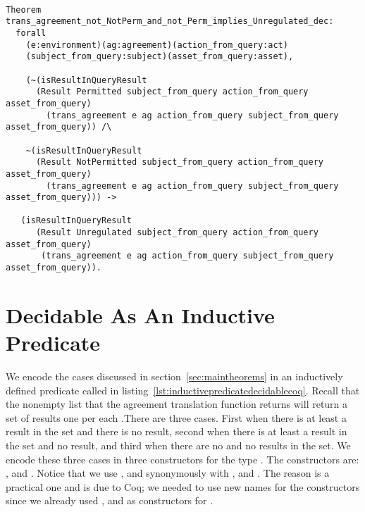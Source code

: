 \begin{lstlisting}

Theorem trans_agreement_not_NotPerm_and_not_Perm_implies_Unregulated_dec:
  forall
    (e:environment)(ag:agreement)(action_from_query:act)
    (subject_from_query:subject)(asset_from_query:asset),

    (~(isResultInQueryResult 
      (Result Permitted subject_from_query action_from_query asset_from_query)
        (trans_agreement e ag action_from_query subject_from_query asset_from_query)) /\

    ~(isResultInQueryResult 
      (Result NotPermitted subject_from_query action_from_query asset_from_query)
        (trans_agreement e ag action_from_query subject_from_query asset_from_query))) ->

   (isResultInQueryResult 
      (Result Unregulated subject_from_query action_from_query asset_from_query)
       (trans_agreement e ag action_from_query subject_from_query asset_from_query)).
\end{lstlisting}


\section{Decidable As An Inductive Predicate}

We encode the cases discussed in section~\ref{sec:maintheorems} in an inductively defined predicate called  in listing~\ref{lst:inductivepredicatedecidablecoq}. Recall that the nonempty list that the agreement translation function  returns will return a set of results one per each .There are three cases. First when there is at least a  result in the set and there is no  result, second when there is at least a  result in the set and no  result, and third when there are no  and no  results in the set. We encode these three cases in three constructors for the type . The constructors are: ,  and . Notice that we use ,  and  synonymously with ,  and . The reason is a practical one and is due to Coq; we needed to use new names for the  constructors since we already used ,  and  as constructors for . 

